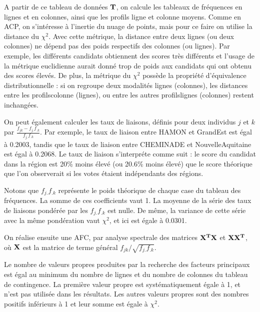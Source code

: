 \documentclass[letterpaper,10pt,english]{jupyterBook}
\begin{document}
\sphinxAtStartPar
A partir de ce tableau de données \(\bf T\), on calcule les tableaux de fréquences en lignes et en colonnes, ainsi que les profils ligne et colonne moyens.
Comme en ACP, on s’intéresse à l’inertie du nuage de points, mais pour ce faire on utilise la distance du \(\chi^2\). Avec cette métrique, la distance entre deux lignes (ou deux colonnes) ne dépend pas des poids respectifs des colonnes (ou lignes). Par exemple, les différents candidats obtiennent des scores très différents et l’usage de la métrique euclidienne aurait donné trop de poids aux candidats qui ont obtenu des scores élevés. De plus, la métrique du \(\chi^2\) possède la propriété d’équivalence distributionnelle : si on regroupe deux modalités lignes (colonnes), les distances entre les profils\sphinxhyphen{}colonne (lignes), ou entre les autres profils\sphinxhyphen{}lignes (colonnes) restent inchangées.

\sphinxAtStartPar
{}

\sphinxAtStartPar
On peut également calculer les taux de liaisons, définis pour deux individus \(j\) et \(k\) par \(\frac{f_{jk}-f_{j.}f_{.k}}{f_{j.}f_{.k}}\). Par exemple, le taux de liaison entre HAMON et Grand\sphinxhyphen{}Est est égal à  \sphinxhyphen{}0.2003, tandis que le taux de liaison entre CHEMINADE et Nouvelle\sphinxhyphen{}Aquitaine est égal à 0.2068. Le taux de liaison s’interpréte comme suit : le score du candidat dans la région est 20\% moins élevé (ou 20.6\% moins élevé) que le score théorique que l’on observerait si les votes étaient indépendants des régions.

\sphinxAtStartPar
Notons que \(f_{j.}f_{.k}\) représente le poids théorique de chaque case du tableau des fréquences. La somme de ces coefficients vaut 1. La moyenne de la série des taux de liaisons pondérée par les \(f_{j.}f_{.k}\) est nulle. De même, la variance de cette série avec la même pondération vaut \(\chi^2\), et ici est égale à 0.0301.

\sphinxAtStartPar
On réalise ensuite une AFC, par analyse spectrale des matrices \(\bf X^T\bf X\) et \(\bf X\bf X^T\), où \(\bf X\) est la matrice de terme général \(f_{jk}/\sqrt{f_{j.}f_{.k}}\).

\sphinxAtStartPar
Le nombre de valeurs propres produites par la recherche des facteurs principaux est égal au minimum du nombre de lignes et du nombre de colonnes du tableau de contingence. La première valeur propre est systématiquement égale à 1, et n’est pas utilisée dans les résultats. Les autres valeurs propres sont des nombres positifs inférieurs à 1 et leur somme est égale à \(\chi^2\).
\end{document}
